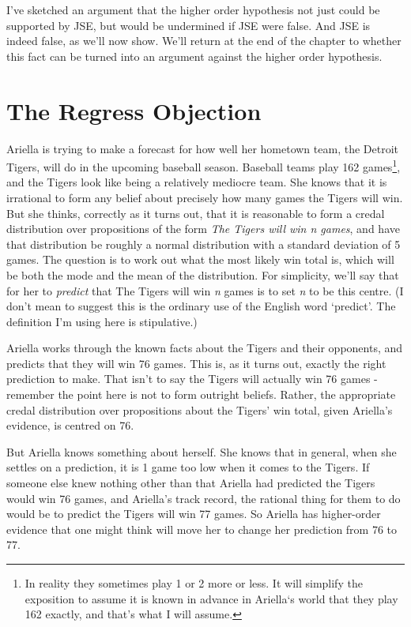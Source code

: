 I've sketched an argument that the higher order hypothesis not just could be supported by JSE, but would be undermined if JSE were false. And JSE is indeed false, as we'll now show. We'll return at the end of the chapter to whether this fact can be turned into an argument against the higher order hypothesis.

\section{The Regress Objection}
\label{theregressobjection}

\gls{Ariella} is trying to make a forecast for how well her hometown team, the Detroit Tigers, will do in the upcoming baseball season. Baseball teams play 162 games\footnote{In reality they sometimes play 1 or 2 more or less. It will simplify the exposition to assume it is known in advance in Ariella`s world that they play 162 exactly, and that's what I will assume.}, and the Tigers look like being a relatively mediocre team. She knows that it is irrational to form any belief about precisely how many games the Tigers will win. But she thinks, correctly as it turns out, that it is reasonable to form a credal distribution over propositions of the form \emph{The Tigers will win n games}, and have that distribution be roughly a normal distribution with a standard deviation of 5 games. The question is to work out what the most likely win total is, which will be both the mode and the mean of the distribution. For simplicity, we'll say that for her to \emph{predict} that The Tigers will win \emph{n} games is to set \emph{n} to be this centre. (I don't mean to suggest this is the ordinary use of the English word `predict'. The definition I'm using here is stipulative.)

\gls{Ariella} works through the known facts about the Tigers and their opponents, and predicts that they will win 76 games. This is, as it turns out, exactly the right prediction to make. That isn't to say the Tigers will actually win 76 games - remember the point here is not to form outright beliefs. Rather, the appropriate credal distribution over propositions about the Tigers' win total, given \gls{Ariella}'s evidence, is centred on 76.

But \gls{Ariella} knows something about herself. She knows that in general, when she settles on a prediction, it is 1 game too low when it comes to the Tigers. If someone else knew nothing other than that \gls{Ariella} had predicted the Tigers would win 76 games, and \gls{Ariella}'s track record, the rational thing for them to do would be to predict the Tigers will win 77 games. So \gls{Ariella} has higher-order evidence that one might think will move her to change her prediction from 76 to 77.

